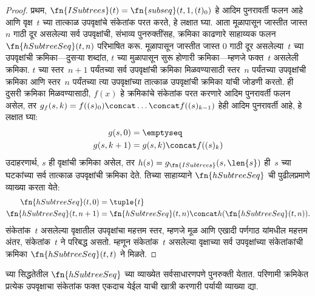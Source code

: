 \documentclass[../../../include/open-logic-section]{subfiles}
\begin{document}
\begin{proof}
  प्रथम, $\fn{ISubtrees}(t) = \fn{subseq}(t, 1, (t)_0)$ हे आदिम पुनरावर्ती
  फलन आहे आणि वृक्ष~$t$ च्या तात्काळ उपवृक्षांचे संकेतांक परत करते, हे लक्षात
  घ्या. आता मूळापासून जास्तीत जास्त $n$ गाठी दूर असलेल्या सर्व उपवृक्षांची,
  संभाव्य पुनरुक्तींसह, क्रमिका काढणारे साहाय्यक फलन
  $\fn{hSubtreeSeq}(t,n)$ परिभाषित करू. मूळापासून जास्तीत जास्त $0$ गाठी
  दूर असलेल्या~$t$ च्या उपवृक्षांची क्रमिका---दुसऱ्या शब्दांत, $t$ च्या
  मुळापासून सुरू होणारी क्रमिका---म्हणजे फक्त~$t$ असलेली क्रमिका. $t$ च्या
  स्तर~$n+1$ पर्यंतच्या सर्व उपवृक्षांची क्रमिका मिळवण्यासाठी स्तर~$n$
  पर्यंतच्या उपवृक्षांची क्रमिका आणि स्तर~$n$ पर्यंतच्या त्या उपवृक्षांच्या
  तात्काळ उपवृक्षांची क्रमिका यांची जोडणी करतो. ही दुसरी क्रमिका मिळवण्यासाठी,
  $f(x)$ हे क्रमिकांचे संकेतांक परत करणारे आदिम पुनरावर्ती फलन असेल, तर
  $g_f(s, k) = f((s)_0) \concat
  \dots \concat f((s)_{k-1})$ हेही आदिम पुनरावर्ती आहे, हे लक्षात घ्या:
    \begin{align*}
      g(s, 0) & = \emptyseq\\
      g(s, k+1) & = g(s, k) \concat f((s)_k)
    \end{align*}
    उदाहरणार्थ, $s$ ही वृक्षांची क्रमिका असेल, तर
    $h(s) = g_{\fn{ISubtrees}}(s, \len{s})$ ही~$s$ च्या घटकांच्या सर्व
    तात्काळ उपवृक्षांची क्रमिका देते. तिच्या साहाय्याने
    $\fn{hSubtreeSeq}$ ची पुढीलप्रमाणे व्याख्या करता येते:
    \begin{align*}
      \fn{hSubtreeSeq}(t, 0) & = \tuple{t} \\
      \fn{hSubtreeSeq}(t, n+1) & = \fn{hSubtreeSeq}(t, n) \concat
      h(\fn{hSubtreeSeq}(t, n)).
    \end{align*}
    संकेतांक~$t$ असलेल्या वृक्षातील उपवृक्षांचा महत्तम स्तर, म्हणजे मूळ आणि
    एखादी पर्णगाठ यांमधील महत्तम अंतर, संकेतांक~$t$ ने परिबद्ध असतो. म्हणून
    संकेतांक~$t$ असलेल्या वृक्षाच्या सर्व उपवृक्षांच्या संकेतांकांची क्रमिका
    $\fn{hSubtreeSeq}(t, t)$ ने मिळते.
\end{proof}

\begin{prob}
   च्या सिद्धतेतील
  $\fn{hSubtreeSeq}$ च्या व्याख्येत सर्वसाधारणपणे पुनरुक्ती येतात. परिणामी
  क्रमिकेत प्रत्येक उपवृक्षाचा संकेतांक फक्त एकदाच येईल याची खात्री करणारी
  पर्यायी व्याख्या द्या.
\end{prob}
\end{document}
